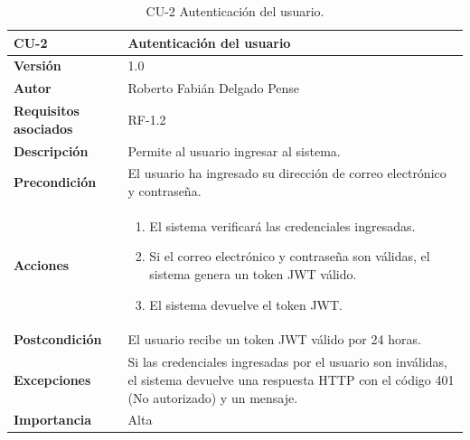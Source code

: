 \begin{table}[p]
    \centering
    \begin{tabularx}{\linewidth}{ p{} X }
        \toprule
        \textbf{CU-2}    & \textbf{Autenticación del usuario}\\
        \toprule
        \textbf{Versión}              & 1.0    \\
        \textbf{Autor}                & Roberto Fabián Delgado Pense \\
        \textbf{Requisitos asociados} & RF-1.2 \\ 
        \textbf{Descripción}          & Permite al usuario ingresar al sistema. \\
        \textbf{Precondición}         & El usuario ha ingresado su dirección de correo electrónico y contraseña. \\
        \textbf{Acciones}             &
        \begin{enumerate}
            \item El sistema verificará las credenciales ingresadas.
            \item Si el correo electrónico y contraseña son válidas, el sistema genera un token JWT válido.
            \item El sistema devuelve el token JWT.
        \end{enumerate}\\
        \textbf{Postcondición}        & El usuario recibe un token JWT válido por 24 horas.\\
        \textbf{Excepciones}          & Si las credenciales ingresadas por el usuario son inválidas, el sistema devuelve una respuesta HTTP con el código 401 (No autorizado) y un mensaje. \\
        \textbf{Importancia}          & Alta \\
        \bottomrule
    \end{tabularx}
    \caption{CU-2 Autenticación del usuario.}
\end{table}

